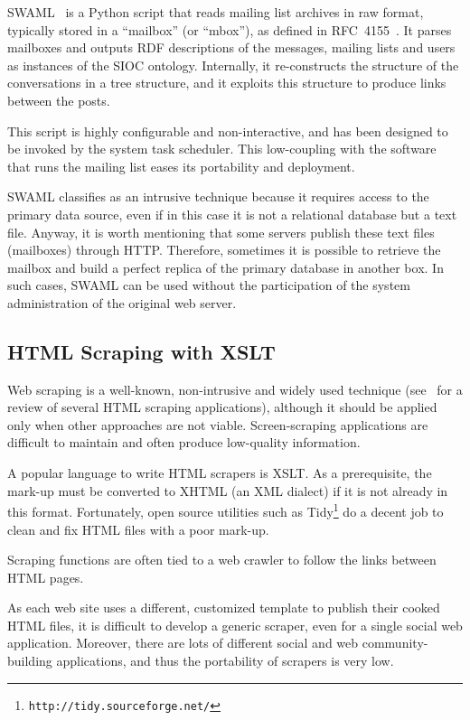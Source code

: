 \documentclass{../templates/www2008-submission}
\begin{document}
SWAML~\cite{SWAML2007} is a Python script that reads mailing 
list archives in raw format, typically stored in a ``mailbox'' 
(or ``mbox''), as defined in RFC~4155~\cite{RFC4155}. It parses
mailboxes and outputs RDF descriptions of the messages, mailing lists
and users as instances of the SIOC ontology. Internally, it re-constructs
the structure of the conversations in a tree structure, and it exploits
this structure to produce links between the posts.

This script is highly configurable and non-interactive, and has been
designed to be invoked by the system task scheduler. This low-coupling with
the software that runs the mailing list eases its portability and
deployment.

SWAML classifies as an intrusive technique because
it requires access to the primary data source, even if in this case
it is not a relational database but a text file. Anyway, it is
worth mentioning that some servers publish these text files
(mailboxes) through HTTP. Therefore, sometimes it is possible to
retrieve the mailbox and build a perfect replica of the primary
database in another box. In such cases, SWAML can be used without the
participation of the system administration of the original
web server.

\subsection{HTML Scraping with XSLT}

Web scraping is a well-known, non-intrusive and widely used technique
(see~\cite{Coetzee2008} for a review of several HTML scraping applications),
although it should be applied only when other approaches are not viable.
Screen-scraping applications are difficult to maintain and
often produce low-quality information.

A popular language to write HTML scrapers is XSLT. As a prerequisite,
the mark-up must be converted to XHTML (an XML dialect) if it is not
already in this format. Fortunately, open source utilities such as
Tidy\footnote{\texttt{http://tidy.sourceforge.net/}} do a decent job
to clean and fix HTML files with a poor mark-up.

Scraping functions are often tied to a web crawler to follow the
links between HTML pages.

As each web site uses a different, customized template to
publish their cooked HTML files, it is
difficult to develop a generic scraper, even for a single social
web application. Moreover, there are lots of different social and
web community-building applications, and thus the portability of scrapers
is very low.
\end{document}
